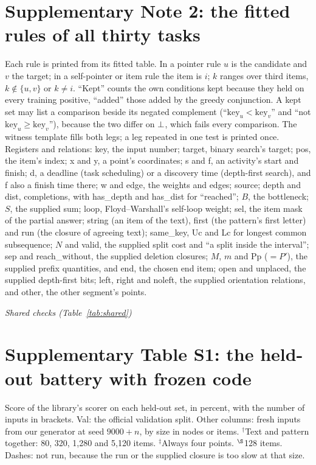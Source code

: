 \section*{Supplementary Note 2: the fitted rules of all thirty tasks}

Each rule is printed from its fitted table. In a pointer rule $u$ is the candidate and $v$ the target; in a
self-pointer or item rule the item is $i$; $k$ ranges over third items, $k\notin\{u,v\}$ or $k \neq i$. ``Kept'' counts
the own conditions kept because they held on every training positive, ``added'' those added by the greedy conjunction.
A kept set may list a comparison beside its negated complement (``$\mathrm{key}_u<\mathrm{key}_v$'' and ``not
$\mathrm{key}_u\geq\mathrm{key}_v$''), because the two differ on $\bot$, which fails every comparison. The witness
template fills both legs; a leg repeated in one test is printed once. Registers and relations: key, the input number;
target, binary search's target; pos, the item's index; x and y, a point's coordinates; s and f, an activity's start and
finish; d, a deadline (task scheduling) or a discovery time (depth-first search), and f also a finish time there; w and
edge, the weights and edges; source; depth and dist, completions, with has\_depth and has\_dist for ``reached''; $B$, the
bottleneck; $S$, the supplied sum; loop, Floyd--Warshall's self-loop weight; sel, the item mask of the partial answer;
string (an item of the text), first (the pattern's first letter) and run (the closure of agreeing text); same\_key, Uc
and Lc for longest common subsequence; $N$ and valid, the supplied split cost and ``a split inside the interval''; sep
and reach\_without, the supplied deletion closures; $M$, $m$ and Pp ($=P'$), the supplied prefix quantities, and end,
the chosen end item; open and unplaced, the supplied depth-first bits; left, right and noleft, the supplied orientation
relations, and other, the other segment's points.

{\small


\medskip\noindent\textit{Shared checks (Table~\ref{tab:shared})}\par

}

\section*{Supplementary Table S1: the held-out battery with frozen code}

{\small Score of the library's scorer on each held-out set, in percent, with the number of inputs in brackets. Val: the
official validation split. Other columns: fresh inputs from our generator at seed $9000+n$, by size in nodes or items.
$^\dagger$Text and pattern together: 80, 320, 1,280 and 5,120 items. $^\ddagger$Always four points.
$^\S$128 items. Dashes: not run, because the run or the supplied closure is too slow at that size.\par}
\begin{center}\scriptsize

\end{center}
